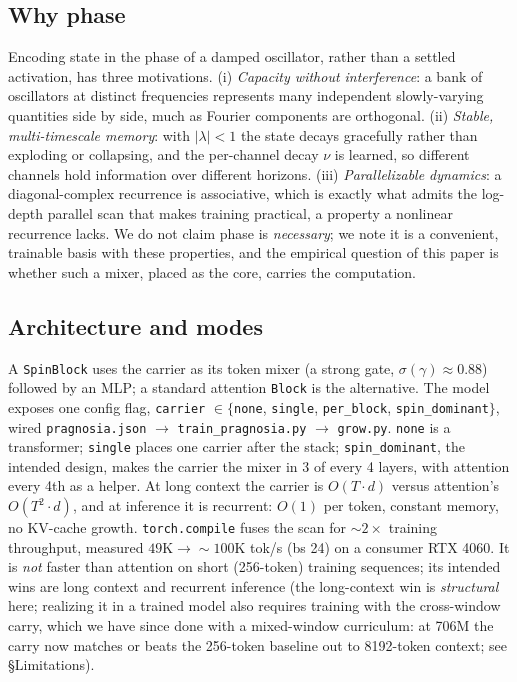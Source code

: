 \documentclass[11pt]{article}
\newcommand{\code}[1]{\texttt{#1}}
\begin{document}
\subsection{Why phase}
Encoding state in the phase of a damped oscillator, rather than a settled activation, has three motivations. (i) \emph{Capacity without interference}: a bank of oscillators at distinct frequencies represents many independent slowly-varying quantities side by side, much as Fourier components are orthogonal. (ii) \emph{Stable, multi-timescale memory}: with $|\lambda|<1$ the state decays gracefully rather than exploding or collapsing, and the per-channel decay $\nu$ is learned, so different channels hold information over different horizons. (iii) \emph{Parallelizable dynamics}: a diagonal-complex recurrence is associative, which is exactly what admits the log-depth parallel scan that makes training practical, a property a nonlinear recurrence lacks. We do not claim phase is \emph{necessary}; we note it is a convenient, trainable basis with these properties, and the empirical question of this paper is whether such a mixer, placed as the core, carries the computation.

\subsection{Architecture and modes}
A \code{SpinBlock} uses the carrier as its token mixer (a strong gate, $\sigma(\gamma)\approx0.88$) followed by an MLP; a standard attention \code{Block} is the alternative. The model exposes one config flag, \code{carrier} $\in \{$\code{none}, \code{single}, \code{per\_block}, \code{spin\_dominant}$\}$, wired \code{pragnosia.json} $\to$ \code{train\_pragnosia.py} $\to$ \code{grow.py}. \code{none} is a transformer; \code{single} places one carrier after the stack; \code{spin\_dominant}, the intended design, makes the carrier the mixer in 3 of every 4 layers, with attention every 4th as a helper. At long context the carrier is $O(T\cdot d)$ versus attention's $O(T^2\cdot d)$, and at inference it is recurrent: $O(1)$ per token, constant memory, no KV-cache growth. \code{torch.compile} fuses the scan for ${\sim}2\times$ training throughput, measured $49\text{K} \to {\sim}100\text{K}$ tok/s (bs 24) on a consumer RTX 4060. It is \emph{not} faster than attention on short (256-token) training sequences; its intended wins are long context and recurrent inference (the long-context win is \emph{structural} here; realizing it in a trained model also requires training with the cross-window carry, which we have since done with a mixed-window curriculum: at 706M the carry now matches or beats the 256-token baseline out to 8192-token context; see \S Limitations).
\end{document}
